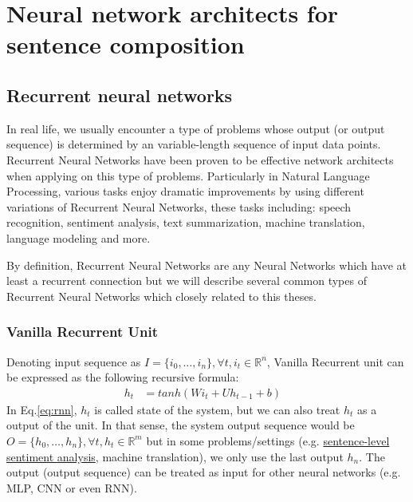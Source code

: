 \section{Neural network architects for sentence composition}\label{sec:composer}
\subsection{Recurrent neural networks}\label{sec:RNN}
In real life, we usually encounter a type of problems whose output (or output sequence) is determined by an variable-length sequence of input data points. 
Recurrent Neural Networks have been proven to be effective network architects when applying on this type of problems.  
Particularly in Natural Language Processing, various tasks enjoy dramatic improvements by using different variations of Recurrent Neural Networks, these tasks including:  speech recognition\cite{speech-lstm}\cite{MiaoGM15}, sentiment analysis\cite{treeLSTM}\cite{cnn-rnn}\cite{attention-gru}, text summarization\cite{RushCW15}\cite{NallapatiXZ16}, machine translation\cite{FiratCB16}\cite{SutskeverVL14}\cite{BritzGLL17}, language modeling\cite{mikolov-nlm}\cite{JozefowiczVSSW16} and more\cite{deep-nlp}\cite{Schmidhuber14}\cite{deeplearning-book}.

By definition, Recurrent Neural Networks are any Neural Networks which have at least a recurrent connection\cite{rnn-def} but we will describe several common types of Recurrent Neural Networks which closely related to this theses.

\subsubsection{Vanilla Recurrent Unit}\label{sec:vanilla-rnn}
Denoting input sequence as \(I = \{i_0,\ldots,i_n\}, \forall t, i_t \in \mathbb{R}^n\), Vanilla Recurrent unit can be expressed as the following recursive formula\cite{treeLSTM}:
\begin{align}
  	h_t &= tanh(Wi_t + Uh_{t-1} + b)&\label{eq:rnn}
\end{align}
In Eq.\ref{eq:rnn}, \(h_t\) is called state of the system\cite{deeplearning-book}, but we can also treat \(h_t\) as a output of the unit.  
In that sense, the system output sequence would be \(O = \{h_0,\ldots,h_n\}, \forall t, h_t \in \mathbb{R}^m\) but in some problems/settings (e.g. \hyperref[sec:sent-level]{sentence-level sentiment analysis}, machine translation\cite{SutskeverVL14}), we only use the last output \(h_n\).
The output (output sequence) can be treated as input for other neural networks (e.g. MLP, CNN or even RNN).
 
